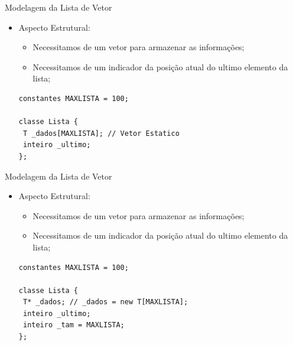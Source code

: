 \documentclass[12pt,table,xcolor={dvipsnames}]{beamer}
\begin{document}
\begin{frame}[fragile]{Modelagem da Lista de Vetor}

\begin{itemize}
\item Aspecto Estrutural:
\begin{itemize}
\item Necessitamos de um vetor para armazenar as informações;
\item Necessitamos de um indicador da posição atual do ultimo elemento da lista;
\end{itemize}
\begin{lstlisting}
constantes MAXLISTA = 100;

classe Lista {
 T _dados[MAXLISTA]; // Vetor Estatico
 inteiro _ultimo;        
};
\end{lstlisting}
\end{itemize}
\end{frame}

\begin{frame}[fragile]{Modelagem da Lista de Vetor}

\begin{itemize}
\item Aspecto Estrutural:
\begin{itemize}
\item Necessitamos de um vetor para armazenar as informações;
\item Necessitamos de um indicador da posição atual do ultimo elemento da lista;
\end{itemize}
\begin{lstlisting}
constantes MAXLISTA = 100;

classe Lista {
 T* _dados; // _dados = new T[MAXLISTA];
 inteiro _ultimo;
 inteiro _tam = MAXLISTA;        
};
\end{lstlisting}
\end{itemize}
\end{frame}
\end{document}
